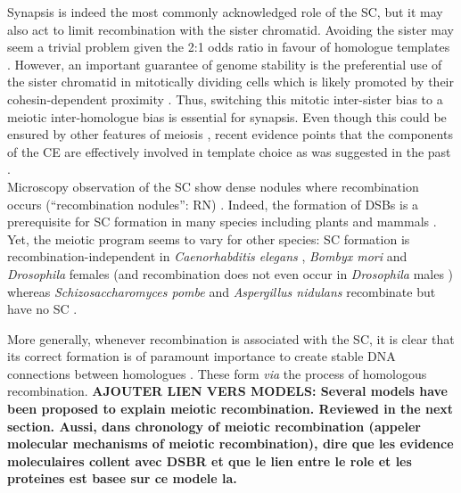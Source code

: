 Synapsis is indeed the most commonly acknowledged role of the SC, but it may also act to limit recombination with the sister chromatid.
Avoiding the sister may seem a trivial problem given the 2:1 odds ratio in favour of homologue templates \citep{lao2010trying}. 
However, an important guarantee of genome stability is the preferential use of the sister chromatid in mitotically dividing cells \citep{kadyk1992sister,bzymek2010double} which is likely promoted by their cohesin-dependent proximity \citep{sjogren2010sphase}.
Thus, switching this mitotic inter-sister bias to a meiotic inter-homologue bias is essential for synapsis.
Even though this could be ensured by other features of meiosis \citep[reviewed in \citealp{humphryes2014non}]{schwacha1997interhomolog, goldfarb2010frequent, hong2013logic}, recent evidence points that the components of the CE are effectively involved in template choice \citep{kim2010sister} as was suggested in the past \citep{haber1998meiosis}.\\

Microscopy observation of the SC show dense nodules where recombination occurs (“recombination nodules”: RN) \citep{carpenter1975electron, schmekel1998evidence}.
Indeed, the formation of DSBs is a prerequisite for SC formation in many species including plants and mammals \citep{zickler1999meiotic, henderson2004tying}.
Yet, the meiotic program seems to vary for other species: SC formation is recombination-independent in \textit{Caenorhabditis elegans} \citep{dernburg1998meiotic}, \textit{Bombyx mori} \citep{rasmussen1977transformation} and \textit{Drosophila} females \citep{mckim1998meiotic} (and recombination does not even occur in \textit{Drosophila} males \citep[reviewed in][]{tsai2011homologous}) whereas \textit{Schizosaccharomyces pombe} \citep{bahler1993unusual} and \textit{Aspergillus nidulans} \citep{egel1982meiosis} recombinate but have no SC \citep[reviewed in][]{zickler2015recombination}.

More generally, whenever recombination is associated with the SC, it is clear that its correct formation is of paramount importance to create stable DNA connections between homologues \citep[reviewed in \citealp{hunter2003synaptonemal}]{hunter2001singleend}.
These form \textit{via} the process of homologous recombination.
\textbf{AJOUTER LIEN VERS MODELS\@: Several models have been proposed to explain meiotic recombination. Reviewed in the next section. Aussi, dans chronology of meiotic recombination (appeler molecular mechanisms of meiotic recombination), dire que les evidence moleculaires collent avec DSBR et que le lien entre le role et les proteines est basee sur ce modele la.}

